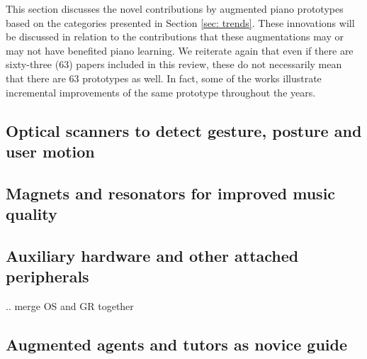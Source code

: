 \documentclass[sigchi, review]{acmart}
\begin{document}
This section discusses the novel contributions by augmented piano prototypes based on the categories presented in Section \ref{sec: trends}. These innovations will be discussed in relation to the contributions that these augmentations may or may not have benefited piano learning. We reiterate again that even if there are sixty-three (63) papers included in this review, these do not necessarily mean that there are 63 prototypes as well. In fact, some of the works illustrate incremental improvements of the same prototype throughout the years. 

\subsection{Optical scanners to detect gesture, posture and user motion}
\label{subsec: gesture}


\subsection{Magnets and resonators for improved music quality}
\label{subsec: magnets}


\subsection{Auxiliary hardware and other attached peripherals}
\label{subsec: auxiliary}

.. merge OS and GR together

\subsection{Augmented agents and tutors as novice guide}
\label{subsec: agent}
\end{document}

